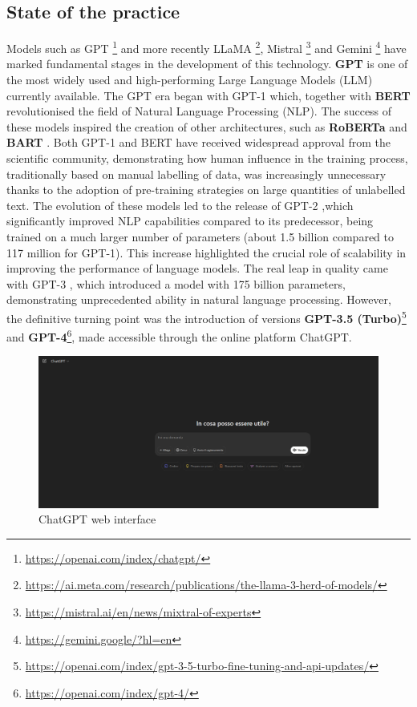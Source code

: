 \subsection{State of the practice}
Models such as GPT \footnote{\url{https://openai.com/index/chatgpt/}} and more recently LLaMA \footnote{\url{https://ai.meta.com/research/publications/the-llama-3-herd-of-models/}}, Mistral \footnote{\url{https://mistral.ai/en/news/mixtral-of-experts}} and Gemini \footnote{\url{https://gemini.google/?hl=en}} have marked fundamental stages in the development of this technology.
\textbf{GPT} is one of the most widely used and high-performing Large Language Models (LLM) currently available.
The GPT era began with GPT-1 \cite{GPT1} which, together with \textbf{BERT} \cite{Bert}  revolutionised the field of Natural Language Processing (NLP).
The success of these models inspired the creation of other architectures, such as \textbf{RoBERTa} \cite{Roberta} and \textbf{BART} \cite{BART}.
Both GPT-1 \cite{GPT1} and BERT \cite{Bert} have received widespread approval from the scientific community, demonstrating how human influence in the training process, traditionally based on manual labelling of data, was increasingly unnecessary thanks to the adoption of pre-training strategies on large quantities of unlabelled text. 
The evolution of these models led to the release of GPT-2 \cite{GPT2},which significantly improved NLP capabilities compared to its predecessor, being trained on a much larger number of parameters (about 1.5 billion compared to 117 million for GPT-1). This increase highlighted the crucial role of scalability in improving the performance of language models. 
The real leap in quality came with GPT-3 \cite{GPT3}, which introduced a model with 175 billion parameters, demonstrating unprecedented ability in natural language processing. However, the definitive turning point was the introduction of versions \textbf{GPT-3.5 (Turbo)}\footnote{\url{https://openai.com/index/gpt-3-5-turbo-fine-tuning-and-api-updates/}} and \textbf{GPT-4}\footnote{\url{https://openai.com/index/gpt-4/}}, made accessible through the online platform ChatGPT.
\begin{figure}[h]
    \centering
    \includegraphics[width=0.7\linewidth]{Figures/Interfaccia.png}
    \caption{ChatGPT web interface}
    \label{fig:graph}
\end{figure}
